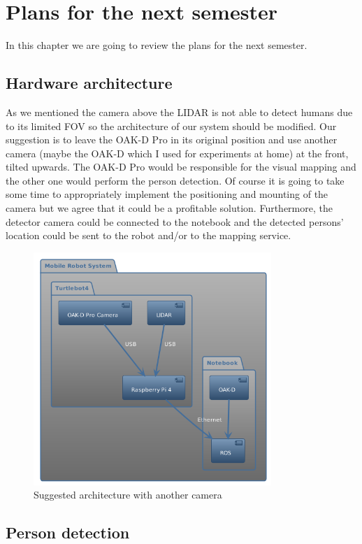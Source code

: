 \chapter{Plans for the next semester} \label{future_plans}

In this chapter we are going to review the plans for the next semester.

\section{Hardware architecture}

As we mentioned the camera above the LIDAR is not able to detect humans due to its limited FOV so the architecture of our system should be modified. Our suggestion is to leave the OAK-D Pro in its original position and use another camera (maybe the OAK-D which I used for experiments at home) at the front, tilted upwards. The OAK-D Pro would be responsible for the visual mapping and the other one would perform the person detection. Of course it is going to take some time to appropriately implement the positioning and mounting of the camera but we agree that it could be a profitable solution. Furthermore, the detector camera could be connected to the notebook and the detected persons' location could be sent to the robot and/or to the mapping service.

\begin{figure}[H]
    \centering
    \includegraphics[width=90mm, keepaspectratio]{figures/suggested_architecture.png}
    \caption{Suggested architecture with another camera}
    \label{fig:suggested_architecture}
\end{figure}

\section{Person detection}

